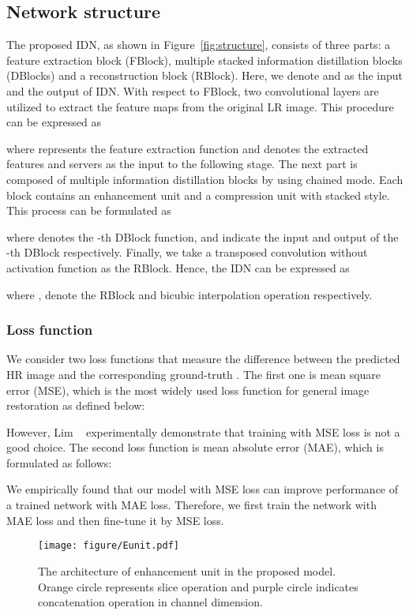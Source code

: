 \documentclass[10pt,twocolumn,letterpaper]{article}
\begin{document}
\subsection{Network structure}

The proposed IDN, as shown in Figure~\ref{fig:structure}, consists of three parts: a feature extraction block (FBlock), multiple stacked information distillation blocks (DBlocks) and a reconstruction block (RBlock). Here, we denote  and  as the input and the output of IDN. With respect to FBlock, two  convolutional layers are utilized to extract the feature maps from the original LR image. This procedure can be expressed as

where  represents the feature extraction function and  denotes the extracted features and servers as the input to the following stage. The next part is composed of multiple information distillation blocks by using chained mode. Each block contains an enhancement unit and a compression unit with stacked style. This process can be formulated as

where  denotes the -th DBlock function,  and  indicate the input and output of the -th DBlock respectively. Finally, we take a transposed convolution without activation function as the RBlock. Hence, the IDN can be expressed as

where ,  denote the RBlock and bicubic interpolation operation respectively.
\subsubsection{Loss function}
We consider two loss functions that measure the difference between the predicted HR image  and the corresponding ground-truth . The first one is mean square error (MSE), which is the most widely used loss function for general image restoration as defined below:

However, Lim \etal~\cite{EDSR} experimentally demonstrate that training with MSE loss is not a good choice. The second loss function is mean absolute error (MAE), which is formulated as follows:

We empirically found that our model with MSE loss can improve performance of a trained network with MAE loss. Therefore, we first train the network with MAE loss and then fine-tune it by MSE loss.

\begin{figure}[htb]
	\begin{center}
		\texttt{[image: figure/Eunit.pdf]}
	\end{center}
	\caption{The architecture of enhancement unit in the proposed model. Orange circle represents slice operation and purple circle indicates concatenation operation in channel dimension.}
	\label{fig:Eunit}
\end{figure}
\end{document}
